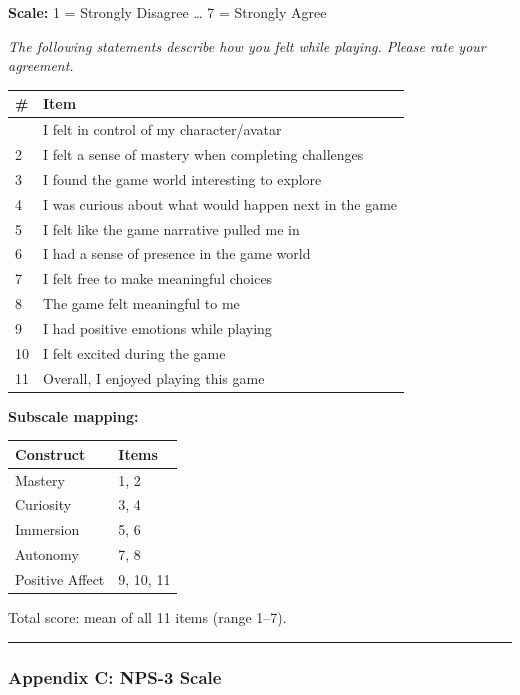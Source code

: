 \textbf{Scale:} 1 = Strongly Disagree \ldots{} 7 = Strongly Agree

\emph{The following statements describe how you felt while playing.
Please rate your agreement.}

\begin{longtable}[]{@{}ll@{}}
\toprule\noalign{}
\# & Item \\
\midrule\noalign{}
\endhead
\bottomrule\noalign{}
\endlastfoot
1 & I felt in control of my character/avatar \\
2 & I felt a sense of mastery when completing challenges \\
3 & I found the game world interesting to explore \\
4 & I was curious about what would happen next in the game \\
5 & I felt like the game narrative pulled me in \\
6 & I had a sense of presence in the game world \\
7 & I felt free to make meaningful choices \\
8 & The game felt meaningful to me \\
9 & I had positive emotions while playing \\
10 & I felt excited during the game \\
11 & Overall, I enjoyed playing this game \\
\end{longtable}

\textbf{Subscale mapping:}

\begin{longtable}[]{@{}ll@{}}
\toprule\noalign{}
Construct & Items \\
\midrule\noalign{}
\endhead
\bottomrule\noalign{}
\endlastfoot
Mastery & 1, 2 \\
Curiosity & 3, 4 \\
Immersion & 5, 6 \\
Autonomy & 7, 8 \\
Positive Affect & 9, 10, 11 \\
\end{longtable}

Total score: mean of all 11 items (range 1--7).

\begin{center}\rule{0.5\linewidth}{0.5pt}\end{center}

\subsubsection{Appendix C: NPS-3 Scale}\label{appendix-c-nps-3-scale}

